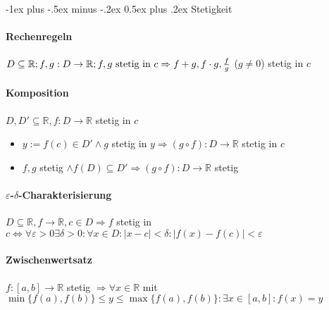 \documentclass[paper=a3,paper=landscape, fontsize=9pt,DIV=25]{scrartcl}
\makeatletter
\newcommand{\real}{{\mathbb{R}}}
\renewcommand{\section}{\@startsection{section}{1}{0mm}%
                                {-1ex plus -.5ex minus -.2ex}%
                                {0.5ex plus .2ex}%
                                {\normalfont\large\bfseries}}
\makeatother
\begin{document}
\begin{multicols*}{4}
		\section{Stetigkeit}
			\paragraph{Rechenregeln}
			$D \subseteq \real;f,g: D \rightarrow \real;f,g ~\text{stetig in}\ c \\ \Rightarrow f+g, f \cdot g,\frac{f}{g}$ ($g \neq 0$) stetig in $c$
			\paragraph{Komposition}
			$D,D' \subseteq \real, f:D \rightarrow \real$ stetig in $c$
			\begin{itemize}
				\item $y := f(c) \in D' \wedge g $ stetig in $y \Rightarrow (g \circ f): D \rightarrow \real$ stetig in $c$
				\item $f,g$ stetig $\wedge f(D) \subseteq D' \Rightarrow (g \circ f): D \rightarrow \real$ stetig
			\end{itemize}
			\paragraph{$\varepsilon$-$\delta$-Charakterisierung}
			$D \subseteq \real, f \rightarrow \real, c \in D \Rightarrow f$ stetig in $c \Leftrightarrow \forall \varepsilon > 0 \exists \delta > 0: \forall x \in D: \lvert x - c \rvert < \delta: \lvert f(x)-f(c)\rvert < \varepsilon$
			\paragraph{Zwischenwertsatz}
			$f:[a,b] \rightarrow \real$ stetig $\Rightarrow \forall x \in \real$ mit $ \min\{f(a),f(b)\} \leq y \leq \max\{f(a), f(b)\}: \exists x \in [a,b]: f(x)=y$

\end{multicols*}
\end{document}
